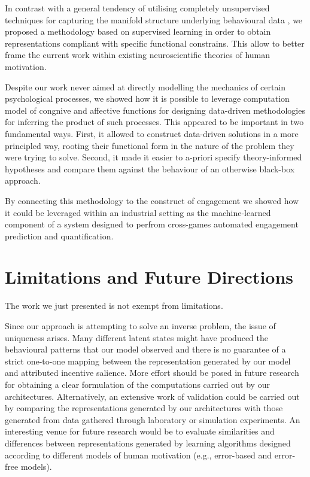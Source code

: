 In contrast with a general tendency of utilising completely unsupervised techniques for capturing the manifold structure underlying behavioural data \cite{calhoun2019unsupervised, luxem2020identifying, pereira2020quantifying, shi2021learning, mccullough2021unsupervised}, we proposed a methodology based on supervised learning in order to obtain representations compliant with specific functional constrains. This allow to better frame the current work within existing neuroscientific theories of human motivation. 

Despite our work never aimed at directly modelling the mechanics of certain psychological processes, we showed how it is possible to leverage computation model of congnive and affective functions for designing data-driven methodologies for inferring the product of such processes. This appeared to be important in two fundamental ways. First, it allowed to construct data-driven solutions in a more principled way, rooting their functional form in the nature of the problem they were trying to solve. Second, it made it easier to a-priori specify theory-informed hypotheses and compare them against the behaviour of an otherwise black-box approach.

By connecting this methodology to the construct of engagement we showed how it could be leveraged within an industrial setting as the machine-learned component of a system designed to perfrom cross-games automated engagement prediction and quantification.

\section{Limitations and Future Directions}
\label{discussion_limitations}
The work we just presented is not exempt from limitations. 

Since our approach is attempting to solve an inverse problem, the issue of uniqueness arises. Many different latent states might have produced the behavioural patterns that our model observed and there is no guarantee of a strict one-to-one mapping between the representation generated by our model and attributed incentive salience.  More effort should be posed in future research for obtaining a clear formulation of the computations carried out by our architectures. Alternatively, an extensive work of validation could be carried out by comparing the representations generated by our architectures with those generated from data gathered through laboratory or simulation experiments. An interesting venue for future research would be to evaluate similarities and differences between representations generated by learning algorithms designed according to different models of human motivation (e.g., error-based \cite{schultz1997neural} and error-free \cite{friston2012active} models).


